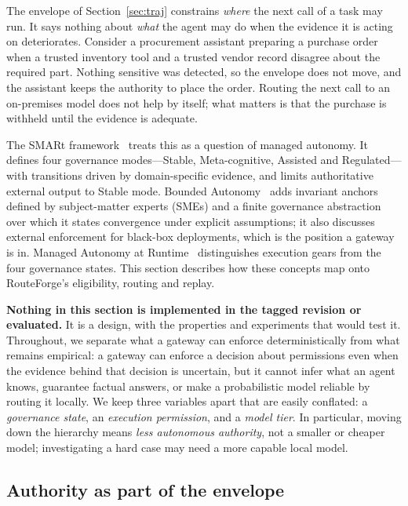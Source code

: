 \documentclass[11pt]{article}
\begin{document}
The envelope of Section~\ref{sec:traj} constrains \emph{where} the next call of a task may run.
It says nothing about \emph{what} the agent may do when the evidence it is acting on
deteriorates. Consider a procurement assistant preparing a purchase order when a trusted
inventory tool and a trusted vendor record disagree about the required part. Nothing sensitive
was detected, so the envelope does not move, and the assistant keeps the authority to place the
order. Routing the next call to an on-premises model does not help by itself; what matters is
that the purchase is withheld until the evidence is adequate.

The SMARt framework~\cite{smartma} treats this as a question of managed autonomy. It defines
four governance modes---Stable, Meta-cognitive, Assisted and Regulated---with transitions driven
by domain-specific evidence, and limits authoritative external output to Stable mode.
Bounded Autonomy~\cite{smartbounded} adds invariant anchors defined by subject-matter experts
(SMEs) and a finite governance abstraction over which it states convergence under explicit
assumptions; it also discusses external enforcement for black-box deployments, which is the
position a gateway is in. Managed Autonomy at Runtime~\cite{smartgears} distinguishes execution
gears from the four governance states. This section describes how these concepts map onto
RouteForge's eligibility, routing and replay.

\textbf{Nothing in this section is implemented in the tagged revision or evaluated.} It is a
design, with the properties and experiments that would test it. Throughout, we separate what a
gateway can enforce deterministically from what remains empirical: a gateway can enforce a
decision about permissions even when the evidence behind that decision is uncertain, but it
cannot infer what an agent knows, guarantee factual answers, or make a probabilistic model
reliable by routing it locally. We keep three variables apart that are easily conflated: a
\emph{governance state}, an \emph{execution permission}, and a \emph{model tier}. In particular,
moving down the hierarchy means \emph{less autonomous authority}, not a smaller or cheaper
model; investigating a hard case may need a more capable local model.

\subsection{Authority as part of the envelope}
\label{sec:smart-state}
\end{document}
